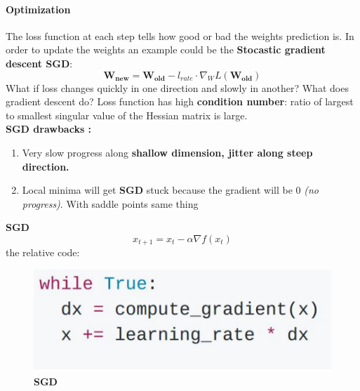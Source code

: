 \documentclass[11pt]{article}
\begin{document}
\paragraph{Optimization}
The loss function at each step tells how good  or bad the weights prediction is. In order to  update the weights an example could be the \textbf{Stocastic gradient descent SGD}:
\begin{equation}
    \mathbf{W_{new}}=\mathbf{W_{old}}-l_{rate}\cdot \nabla_W L(\mathbf{W_{old}})
\end{equation}{}
What if loss changes quickly in one direction and slowly in another? What does gradient descent do? Loss function has high \textbf{condition number}: ratio of largest to smallest singular value of the Hessian matrix is large. \\
\textbf{SGD drawbacks :}
\begin{enumerate}
    \item  Very slow progress along\textbf{ shallow dimension, jitter along steep direction.}
    \item Local minima will get \textbf{SGD} stuck because the gradient will be 0 \textit{(no progress)}.
With saddle points same thing

\end{enumerate}{}
\begin{minipage}{0.5\textwidth}
\textbf{SGD}\\
\begin{equation}
    x_{t+1}=x_t-\alpha \nabla f(x_t)
\end{equation}{}
the relative code:\\
\begin{figure} [H]
\centering 
\includegraphics[scale=0.58]{L610.pdf}
\caption{ \textbf{SGD}}
\label{fig:L610}
\end{figure}


\end{minipage}
\end{document}
